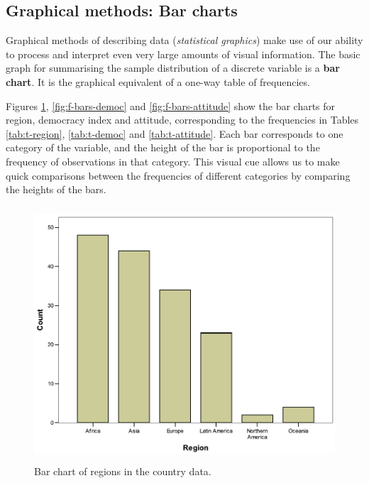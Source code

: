 \documentclass[11pt,a4paper,openany]{book}
\begin{document}
\subsection{Graphical methods: Bar charts}\label{ss-descr1-1cat-charts}

Graphical methods of describing data (\emph{statistical graphics}) make
use of our ability to process and interpret even very large amounts of
visual information. The basic graph for summarising the sample
distribution of a discrete variable is a \textbf{bar chart}. It is the
graphical equivalent of a one-way table of frequencies.

Figures \ref{fig:f-bars-region}, \ref{fig:f-bars-democ} and
\ref{fig:f-bars-attitude} show the bar charts for region, democracy
index and attitude, corresponding to the frequencies in Tables
\ref{tab:t-region}, \ref{tab:t-democ} and \ref{tab:t-attitude}. Each bar
corresponds to one category of the variable, and the height of the bar
is proportional to the frequency of observations in that category. This
visual cue allows us to make quick comparisons between the frequencies
of different categories by comparing the heights of the bars.

\begin{figure}[htbp]
\centering
\includegraphics[height=9.50000cm]{regions.pdf}
\caption{\label{fig:f-bars-region} Bar chart of regions in the country
data.}
\end{figure}
\end{document}

